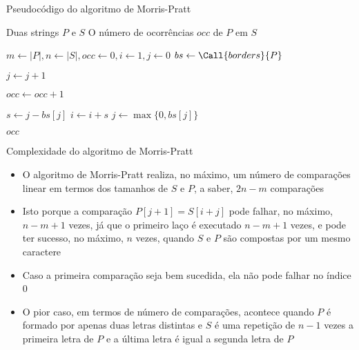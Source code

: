 \begin{frame}[fragile]{Pseudocódigo do algoritmo de Morris-Pratt}

    \begin{algorithm}[H]
        \caption{Algoritmo de Morris-Pratt}
        \begin{algorithmic}[1]
            \Require Duas strings $P$ e $S$
            \Ensure O número de ocorrências $occ$ de $P$ em $S$

                \State $m \gets |P|, n \gets |S|, occ \gets 0, i \gets 1, j \gets 0$
                \State $bs \gets \Call{borders}{P}$

                        \State $j \gets j + 1$
                    \EndWhile

                        \State $occ \gets occ + 1$
                    \EndIf

                    \State $s \gets j - bs[j]$
                    \State $i \gets i + s$
                    \State $j \gets \max\lbrace 0, bs[j]\rbrace$
                \EndWhile

                \State \Return $occ$
            \EndFunction
        \end{algorithmic}
    \end{algorithm}

\end{frame}



\begin{frame}[fragile]{Complexidade do algoritmo de Morris-Pratt}

    \begin{itemize}
        \item O algoritmo de Morris-Pratt realiza, no máximo, um número de comparações linear em 
            termos dos tamanhos de $S$ e $P$, a saber, $2n - m$ comparações

        \item Isto porque a comparação $P[j + 1] = S[i + j]$ pode falhar, no máximo, 
            $n - m + 1$ vezes, já que o primeiro laço é executado $n - m + 1$ vezes, e pode ter 
            sucesso, no máximo, $n$ vezes, quando $S$ e $P$ são compostas por um mesmo
            caractere

        \item Caso a primeira comparação seja bem sucedida, ela não pode falhar no índice 0

        \item O pior caso, em termos de número de comparações, acontece quando $P$ é formado
            por  apenas duas letras distintas e $S$ é uma repetição de $n - 1$ vezes a primeira 
            letra de $P$ e a última letra é igual a segunda letra de $P$
    \end{itemize}

\end{frame}

